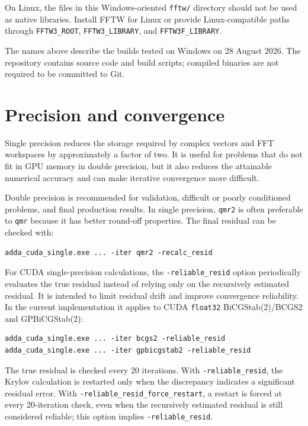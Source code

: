 \documentclass[11pt,a4paper]{article}
\newcommand{\code}[1]{\nolinkurl{#1}}
\begin{document}
On Linux, the files in this Windows-oriented \code{fftw/} directory should not
be used as native libraries. Install FFTW for Linux or provide Linux-compatible
paths through \code{FFTW3_ROOT}, \code{FFTW3_LIBRARY}, and
\code{FFTW3F_LIBRARY}.

The names above describe the builds tested on Windows on 28 August 2026. The
repository contains source code and build scripts; compiled binaries are not
required to be committed to Git.

\section{Precision and convergence}

Single precision reduces the storage required by complex vectors and FFT
workspaces by approximately a factor of two. It is useful for problems that do
not fit in GPU memory in double precision, but it also reduces the attainable
numerical accuracy and can make iterative convergence more difficult.

Double precision is recommended for validation, difficult or poorly
conditioned problems, and final production results. In single precision,
\code{qmr2} is often preferable to \code{qmr} because it has better round-off
properties. The final residual can be checked with:

\begin{lstlisting}
adda_cuda_single.exe ... -iter qmr2 -recalc_resid
\end{lstlisting}

For CUDA single-precision calculations, the \code{-reliable_resid} option
periodically evaluates the true residual instead of relying only on the
recursively estimated residual. It is intended to limit residual drift and
improve convergence reliability. In the current implementation it applies to
CUDA \code{float32} BiCGStab(2)/BCGS2 and GPBiCGStab(2):

\begin{lstlisting}
adda_cuda_single.exe ... -iter bcgs2 -reliable_resid
adda_cuda_single.exe ... -iter gpbicgstab2 -reliable_resid
\end{lstlisting}

The true residual is checked every 20 iterations. With
\code{-reliable_resid}, the Krylov calculation is restarted only when the
discrepancy indicates a significant residual error. With
\code{-reliable_resid_force_restart}, a restart is forced at every 20-iteration
check, even when the recursively estimated residual is still considered
reliable; this option implies \code{-reliable_resid}.
\end{document}
